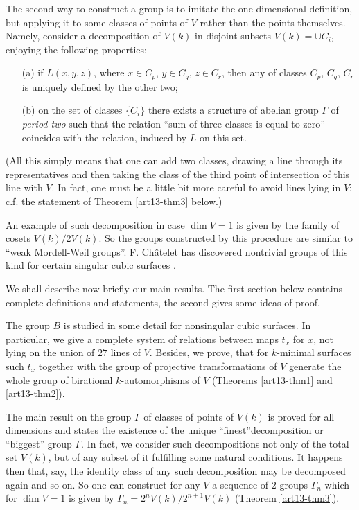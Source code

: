The second way to construct a group is to imitate the one-dimensio\-nal definition, but applying it to some classes of points of $V$ rather than the points themselves. Namely, consider a decomposition of $V(k)$ in disjoint subsets $V(k)=\cup C_{i}$, enjoying the following properties:
\begin{itemize}
\item[(a)] if $L(x,y,z)$, where $x\in C_{p}$, $y\in C_{q}$, $z\in C_{r}$, then any of classes $C_{p}$, $C_{q}$, $C_{r}$ is uniquely defined by the other two;

\item[(b)] on the set of classes $\{C_{i}\}$ there exists a structure of abelian group $\Gamma$ of {\em period two} such that the relation ``sum of three classes is equal to zero'' coincides with the relation, induced by $L$ on this set.
\end{itemize}

(All this simply means that one can add two classes, drawing a line through its representatives and then taking the class of the third point of intersection of this line with $V$. In fact, one must be a little bit more careful to avoid lines lying in $V$: c.f. the statement of Theorem \ref{art13-thm3} below.)

An example of such decomposition in case $\dim V=1$ is given by the family of cosets $V(k)/2V(k)$. So the groups constructed by this procedure are similar to ``weak Mordell-Weil groups''. F. Ch\^atelet has discovered nontrivial groups of this kind for certain singular cubic surfaces \cite{art13-key1}.

We shall describe now briefly our main results. The first section below contains complete definitions and statements, the second gives some ideas of proof.

The group $B$ is studied in some detail for nonsingular cubic surfaces. In particular, we give a complete system of relations between maps $t_{x}$ for $x$, not lying on the union of $27$ lines of $V$. Besides, we prove, that for $k$-minimal surfaces such $t_{x}$ together with the group of projective transformations of $V$ generate the whole group of birational $k$-automorphisms of $V$ (Theorems \ref{art13-thm1} and \ref{art13-thm2}).

The main result on the group $\Gamma$ of classes of points of $V(k)$ is proved for all dimensions and states the existence of the unique ``finest''\pageoriginale decomposition or ``biggest'' group $\Gamma$. In fact, we consider such decompositions not only of the total set $V(k)$, but of any subset of it fulfilling some natural conditions. It happens then that, say, the identity class of any such decomposition may be decomposed again and so on. So one can construct for any $V$ a sequence of $2$-groups $\Gamma_{n}$ which for $\dim V=1$ is given by $\Gamma_{n}=2^{n}V(k)/2^{n+1}V(k)$ (Theorem \ref{art13-thm3}).

